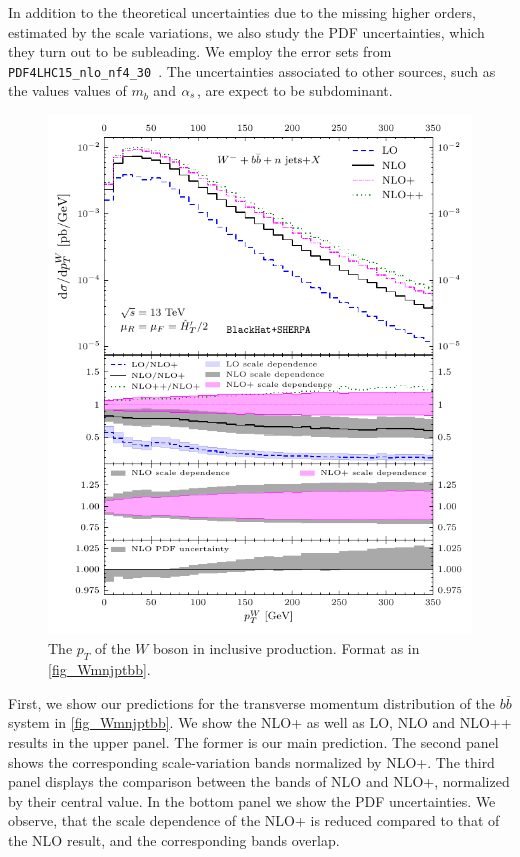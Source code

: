 In addition to the theoretical uncertainties due to the missing higher orders, estimated
by the scale variations, we also study the PDF uncertainties, which 
they turn out to be subleading. 
We employ the error sets from \texttt{PDF4LHC15\_nlo\_nf4\_30}~\cite{Butterworth:2015oua}. 
The uncertainties associated to other sources, such as the values values of $m_b$ and $\alpha_s$,
are expect to be subdominant.

\begin{figure}[ht]
  \centering
  \includegraphics[clip,scale=1]{plots/excl_ptw_v4}
  \caption{The $p_T$ of the $W$ boson in inclusive \Wbbm{} production. Format as in \cref{fig_Wmnjptbb}.}
  \label{fig_Wmnjptw}
\end{figure}

First, we show our predictions  for the transverse momentum distribution of
the $b\bar b$ system in \cref{fig_Wmnjptbb}.
We show the NLO+ as well as LO, NLO and NLO++ results in the upper panel.
The former is our main prediction.
The second panel shows the corresponding scale-variation bands normalized by NLO+.
The third panel displays the comparison between the bands of NLO and NLO+, normalized by their central value.
In the bottom panel we show the PDF uncertainties. 
We observe, that the scale dependence of the NLO+ is reduced compared to that of the NLO result,
and the corresponding bands overlap.
 
